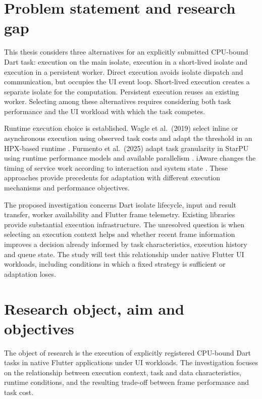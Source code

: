 \documentclass[14pt,a4paper,oneside]{extreport}
\begin{document}
\section{Problem statement and research gap}
\label{problem-statement-and-research-gap}

This thesis considers three alternatives for an explicitly submitted CPU-bound Dart task:
execution on the main isolate, execution in a short-lived isolate and execution in a
persistent worker. Direct execution avoids isolate dispatch and communication, but occupies
the UI event loop. Short-lived execution creates a separate isolate for the computation.
Persistent execution reuses an existing worker. Selecting among these alternatives requires
considering both task performance and the UI workload with which the task competes.

Runtime execution choice is established. Wagle et al.~(2019) select inline or asynchronous
execution using observed task costs and adapt the threshold in an HPX-based runtime
\citep{wagle2019}. Furmento et al.~(2025) adapt task granularity in StarPU using runtime
performance models and available parallelism \citep{furmento2025}. iAware changes the timing
of service work according to interaction and system state \citep{iaware2023}. These approaches
provide precedents for adaptation with different execution mechanisms and performance
objectives.

The proposed investigation concerns Dart isolate lifecycle, input and result transfer, worker
availability and Flutter frame telemetry. Existing libraries provide substantial execution
infrastructure. The unresolved question is when selecting an execution context helps and
whether recent frame information improves a decision already informed by task characteristics,
execution history and queue state. The study will test this relationship under native Flutter
UI workloads, including conditions in which a fixed strategy is sufficient or adaptation
loses.

\section{Research object, aim and objectives}
\label{research-object-aim-and-objectives}

The object of research is the execution of explicitly registered CPU-bound Dart tasks in
native Flutter applications under UI workloads. The investigation focuses on the relationship
between execution context, task and data characteristics, runtime conditions, and the
resulting trade-off between frame performance and task cost.
\end{document}
